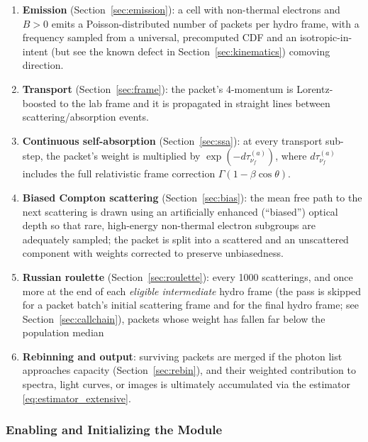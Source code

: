 \documentclass[12pt,a4paper]{article}
\newcommand{\nuf}{\nu_{\!f}}
\begin{document}
\begin{enumerate}[leftmargin=2em]
	\item \textbf{Emission} (Section~\ref{sec:emission}): a cell with
	non-thermal electrons and $B>0$ emits a Poisson-distributed number
	of packets per hydro frame, with a frequency sampled from a
	universal, precomputed CDF and an isotropic-in-intent (but see the
	known defect in Section~\ref{sec:kinematics}) comoving direction.
	
	\item \textbf{Transport} (Section~\ref{sec:frame}): the packet's
	4-momentum is Lorentz-boosted to the lab frame and it is
	propagated in straight lines between scattering/absorption events.
	
	\item \textbf{Continuous self-absorption} (Section~\ref{sec:ssa}):
	at every transport sub-step, the packet's weight is multiplied by
	$\exp(-d\tau_{\nuf}^{(a)})$, where $d\tau_{\nuf}^{(a)}$ includes
	the full relativistic frame correction $\Gamma(1-\beta\cos\theta)$.
	
	\item \textbf{Biased Compton scattering} (Section~\ref{sec:bias}):
	the mean free path to the next scattering is drawn using an
	artificially enhanced (``biased'') optical depth so that rare,
	high-energy non-thermal electron subgroups are adequately sampled;
	the packet is split into a scattered and an unscattered component
	with weights corrected to preserve unbiasedness.
	
	\item \textbf{Russian roulette} (Section~\ref{sec:roulette}): every
	1000 scatterings, and once more at the end of each \emph{eligible
		intermediate} hydro frame (the pass is skipped for a packet batch's
	initial scattering frame and for the final hydro frame; see
	Section~\ref{sec:callchain}), packets whose weight has fallen far
	below the population median
	
	\item \textbf{Rebinning and output}: surviving packets are merged
	if the photon list approaches capacity (Section~\ref{sec:rebin}),
	and their weighted contribution to spectra, light curves, or
	images is ultimately accumulated via the estimator
	\eqref{eq:estimator_extensive}.
\end{enumerate}



\subsubsection{Enabling and Initializing the Module}
\label{sec:operation}
\end{document}
